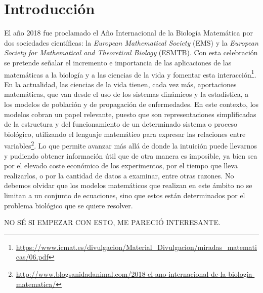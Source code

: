 \chapter{Introducción}
\label{cap:introduccion}


El año 2018 fue proclamado el Año Internacional de la Biología Matemática por dos sociedades científicas: la \textit{European Mathematical Society} (EMS) y la \textit{European Society for Mathematical and Theoretical Biology} (ESMTB). Con esta celebración se pretende señalar el incremento e importancia de las aplicaciones de las matemáticas a la biología y a las ciencias de la vida y fomentar esta interacción\footnote{\url{https://www.icmat.es/divulgacion/Material_Divulgacion/miradas_matematicas/06.pdf}}. En la actualidad, las ciencias de la vida tienen, cada vez más, aportaciones matemáticas, que van desde el uso de los sistemas dinámicos y la estadística, a los modelos de población y de propagación de enfermedades. En este contexto, los modelos cobran un papel relevante, puesto que son representaciones simplificadas de la estructura y del funcionamiento de un determinado sistema o proceso biológico, utilizando el lenguaje matemático para expresar las relaciones entre variables\footnote{\url{http://www.blogsanidadanimal.com/2018-el-ano-internacional-de-la-biologia-matematica/}}. Lo que permite avanzar más allá de donde la intuición puede llevarnos y pudiendo obtener información útil que de otra manera es imposible, ya bien sea por el elevado coste económico de los experimentos, por el tiempo que lleva realizarlos, o por la cantidad de datos a examinar, entre otras razones. No debemos olvidar que los modelos matemáticos que realizan en este ámbito no se limitan a un conjunto de ecuaciones, sino que estos están determinados por el problema biológico que se quiere resolver.

NO SÉ SI EMPEZAR CON ESTO, ME PARECIÓ INTERESANTE.

